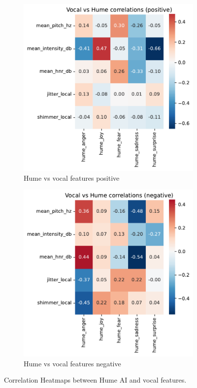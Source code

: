 \begin{figure}[!h]
    \centering 
    \begin{subfigure}[b]{0.45\textwidth}
        \includegraphics[width=\textwidth]{png/results/rq1_new/vocal_vs_hume_correlations_positive.pdf}
        \caption{Hume vs vocal features positive}
        \label{fig:hume_vocal_positive}
    \end{subfigure}
    \begin{subfigure}[b]{0.45\textwidth}
        \includegraphics[width=\textwidth]{png/results/rq1_new/vocal_vs_hume_correlations_negative.pdf}
        \caption{Hume vs vocal features negative}        
        \label{fig:hume_vocal_negative}
    \end{subfigure}   
    \caption{Correlation Heatmaps between Hume AI and vocal features.}
    \label{fig:rq1-heatmaps}     
\end{figure}
